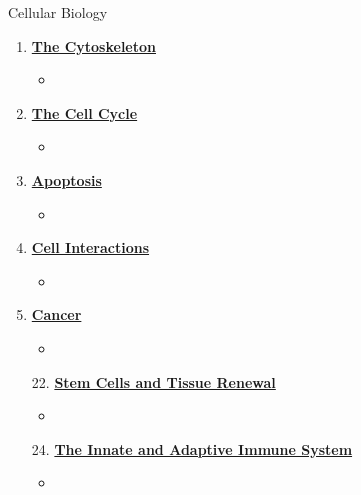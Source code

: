 \documentclass[12pt,letterpaper]{article}
\begin{document}
\begin{chapbox}{Cellular Biology}
{\begin{enumerate}[font=\bfseries, wide]
    \begin{itemize}
        \item 
    \end{itemize}
    \item \hyperlink{16}{\textbf{The Cytoskeleton}}
    \begin{itemize}
        \item 
    \end{itemize}
    \item \hyperlink{17}{\textbf{The Cell Cycle}}
    \begin{itemize}
        \item 
    \end{itemize}
    \item \hyperlink{18}{\textbf{Apoptosis}}
    \begin{itemize}
        \item 
    \end{itemize}
    \item \hyperlink{19}{\textbf{Cell Interactions}}
    \begin{itemize}
        \item 
    \end{itemize}
    \item \hyperlink{20}{\textbf{Cancer}}
    \begin{itemize}
        \item 
    \end{itemize}    
    \item[22.] \hyperlink{22}{\textbf{Stem Cells and Tissue Renewal}}
    \begin{itemize}
        \item 
    \end{itemize}
    \item[24.] \hyperlink{24}{\textbf{The Innate and Adaptive Immune System}}
    \begin{itemize}
        \item 
    \end{itemize}
\end{enumerate}
}\end{chapbox}

\end{document}
